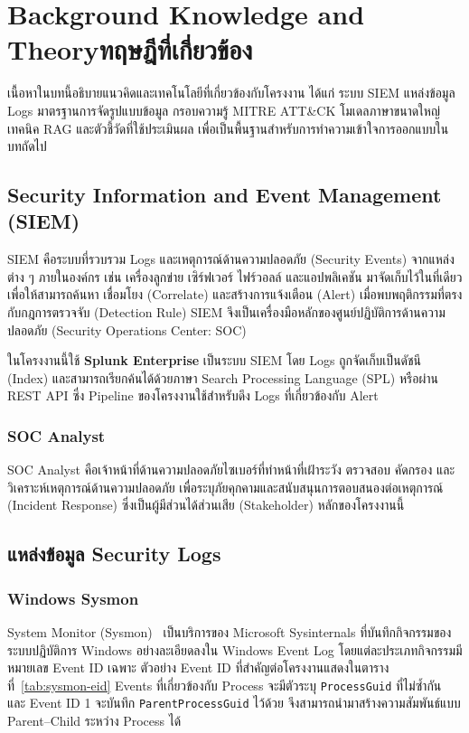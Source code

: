 \chapter{\ifenglish Background Knowledge and Theory\else ทฤษฎีที่เกี่ยวข้อง\fi}

เนื้อหาในบทนี้อธิบายแนวคิดและเทคโนโลยีที่เกี่ยวข้องกับโครงงาน
ได้แก่ ระบบ SIEM แหล่งข้อมูล Logs มาตรฐานการจัดรูปแบบข้อมูล กรอบความรู้ MITRE ATT\&CK
โมเดลภาษาขนาดใหญ่ เทคนิค RAG และตัวชี้วัดที่ใช้ประเมินผล
เพื่อเป็นพื้นฐานสำหรับการทำความเข้าใจการออกแบบในบทถัดไป

\section{Security Information and Event Management (SIEM)}

SIEM คือระบบที่รวบรวม Logs และเหตุการณ์ด้านความปลอดภัย (Security Events)
จากแหล่งต่าง ๆ ภายในองค์กร เช่น เครื่องลูกข่าย เซิร์ฟเวอร์ ไฟร์วอลล์ และแอปพลิเคชัน
มาจัดเก็บไว้ในที่เดียว เพื่อให้สามารถค้นหา เชื่อมโยง (Correlate) และสร้างการแจ้งเตือน (Alert)
เมื่อพบพฤติกรรมที่ตรงกับกฎการตรวจจับ (Detection Rule)
SIEM จึงเป็นเครื่องมือหลักของศูนย์ปฏิบัติการด้านความปลอดภัย (Security Operations Center: SOC)

ในโครงงานนี้ใช้ \textbf{Splunk Enterprise} เป็นระบบ SIEM
โดย Logs ถูกจัดเก็บเป็นดัชนี (Index) และสามารถเรียกค้นได้ด้วยภาษา Search Processing Language (SPL)
หรือผ่าน REST API ซึ่ง Pipeline ของโครงงานใช้สำหรับดึง Logs ที่เกี่ยวข้องกับ Alert

\subsection{SOC Analyst}
SOC Analyst คือเจ้าหน้าที่ด้านความปลอดภัยไซเบอร์ที่ทำหน้าที่เฝ้าระวัง ตรวจสอบ คัดกรอง
และวิเคราะห์เหตุการณ์ด้านความปลอดภัย เพื่อระบุภัยคุกคามและสนับสนุนการตอบสนองต่อเหตุการณ์ (Incident Response)
ซึ่งเป็นผู้มีส่วนได้ส่วนเสีย (Stakeholder) หลักของโครงงานนี้

\section{แหล่งข้อมูล Security Logs}

\subsection{Windows Sysmon}
System Monitor (Sysmon)~\cite{sysmon} เป็นบริการของ Microsoft Sysinternals
ที่บันทึกกิจกรรมของระบบปฏิบัติการ Windows อย่างละเอียดลงใน Windows Event Log
โดยแต่ละประเภทกิจกรรมมีหมายเลข Event ID เฉพาะ ตัวอย่าง Event ID ที่สำคัญต่อโครงงานแสดงในตารางที่~\ref{tab:sysmon-eid}
Events ที่เกี่ยวข้องกับ Process จะมีตัวระบุ \texttt{ProcessGuid} ที่ไม่ซ้ำกัน
และ Event ID 1 จะบันทึก \texttt{ParentProcessGuid} ไว้ด้วย
จึงสามารถนำมาสร้างความสัมพันธ์แบบ Parent--Child ระหว่าง Process ได้

